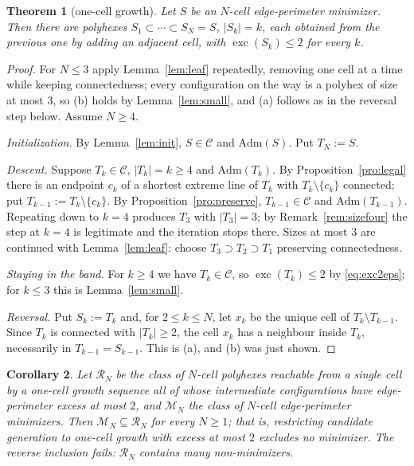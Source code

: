 \documentclass[11pt]{article}
\theoremstyle{plain}
\newtheorem{theorem}{Theorem}[section]
\newtheorem{corollary}[theorem]{Corollary}
\theoremstyle{definition}
\theoremstyle{remark}
\newcommand{\sm}{\setminus}
\DeclareMathOperator{\exc}{exc}
\newcommand{\Adm}{\mathrm{Adm}}
\begin{document}
\begin{theorem}[one-cell growth]\label{thm:altgrowth}
Let \(S\) be an \(N\)-cell edge-perimeter minimizer. Then there are polyhexes
\(S_{1}\subset\cdots\subset S_{N}=S\), \(|S_{k}|=k\), each obtained from the previous one by
adding an adjacent cell, with \(\exc(S_{k})\le2\) for every \(k\).
\end{theorem}
\begin{proof}
For \(N\le3\) apply Lemma~\ref{lem:leaf} repeatedly, removing one cell at a time while
keeping connectedness; every configuration on the way is a polyhex of size at most \(3\), so
(b) holds by Lemma~\ref{lem:small}, and (a) follows as in the reversal step below. Assume
\(N\ge4\).

\emph{Initialization.} By Lemma~\ref{lem:init}, \(S\in\mathcal{C}\) and \(\Adm(S)\). Put
\(T_{N}:=S\).

\emph{Descent.} Suppose \(T_{k}\in\mathcal{C}\), \(|T_{k}|=k\ge4\) and \(\Adm(T_{k})\). By
Proposition~\ref{pro:legal} there is an endpoint \(c_{k}\) of a shortest extreme line of
\(T_{k}\) with \(T_{k}\sm\{c_{k}\}\) connected; put \(T_{k-1}:=T_{k}\sm\{c_{k}\}\). By
Proposition~\ref{pro:preserve}, \(T_{k-1}\in\mathcal{C}\) and \(\Adm(T_{k-1})\). Repeating
down to \(k=4\) produces \(T_{3}\) with \(|T_{3}|=3\); by Remark~\ref{rem:sizefour} the
step at \(k=4\) is legitimate and the iteration stops there. Sizes at most \(3\) are
continued with Lemma~\ref{lem:leaf}: choose \(T_{3}\supset T_{2}\supset T_{1}\) preserving
connectedness.

\emph{Staying in the band.} For \(k\ge4\) we have \(T_{k}\in\mathcal{C}\), so
\(\exc(T_{k})\le2\) by \eqref{eq:exc2eps}; for \(k\le3\) this is Lemma~\ref{lem:small}.

\emph{Reversal.} Put \(S_{k}:=T_{k}\) and, for \(2\le k\le N\), let \(x_{k}\) be the unique
cell of \(T_{k}\sm T_{k-1}\). Since \(T_{k}\) is connected with \(|T_{k}|\ge2\), the cell
\(x_{k}\) has a neighbour inside \(T_{k}\), necessarily in \(T_{k-1}=S_{k-1}\). This is (a),
and (b) was just shown.
\end{proof}

\begin{corollary}\label{cor:reach}
Let \(\mathcal{R}_{N}\) be the class of \(N\)-cell polyhexes reachable from a single cell by
a one-cell growth sequence all of whose intermediate configurations have edge-perimeter
excess at most \(2\), and \(\mathcal{M}_{N}\) the class of \(N\)-cell edge-perimeter
minimizers. Then \(\mathcal{M}_{N}\subseteq\mathcal{R}_{N}\) for every \(N\ge1\); that is,
restricting candidate generation to one-cell growth with excess at most \(2\) excludes no
minimizer. The reverse inclusion fails: \(\mathcal{R}_{N}\) contains many non-minimizers.
\end{corollary}
\end{document}

